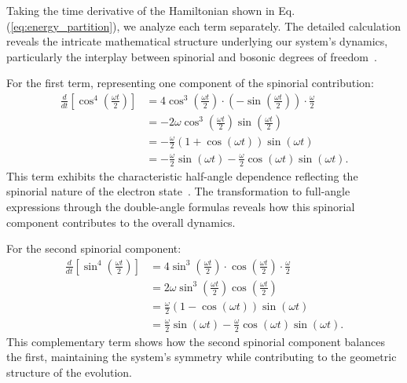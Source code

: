 \documentclass[%
 reprint,
 amsmath,amssymb,
 aps,
]{revtex4-1}
\numberwithin{equation}{section}%
\begin{document}
Taking the time derivative of the Hamiltonian shown in Eq. (\ref{eq:energy_partition}), we analyze each term separately. The detailed calculation reveals the intricate mathematical structure underlying our system's dynamics, particularly the interplay between spinorial and bosonic degrees of freedom~\cite{wilczek1984}.

For the first term, representing one component of the spinorial contribution:
\begin{equation}
    \begin{split}
        \frac{d}{dt}\left[\cos^4\left(\frac{\omega t}{2}\right)\right] &= 4\cos^3\left(\frac{\omega t}{2}\right) \cdot \left(-\sin\left(\frac{\omega t}{2}\right)\right) \cdot \frac{\omega}{2} \\
        &= -2\omega\cos^3\left(\frac{\omega t}{2}\right)\sin\left(\frac{\omega t}{2}\right) \\
        &= -\frac{\omega}{2}(1 + \cos(\omega t))\sin(\omega t) \\
        &= -\frac{\omega}{2}\sin(\omega t) - \frac{\omega}{2}\cos(\omega t)\sin(\omega t).
    \end{split}
    \label{eq:term1}
\end{equation}
This term exhibits the characteristic half-angle dependence reflecting the spinorial nature of the electron state~\cite{hanamura2023}. The transformation to full-angle expressions through the double-angle formulas reveals how this spinorial component contributes to the overall dynamics.

For the second spinorial component:
\begin{equation}
    \begin{split}
        \frac{d}{dt}\left[\sin^4\left(\frac{\omega t}{2}\right)\right] &= 4\sin^3\left(\frac{\omega t}{2}\right) \cdot \cos\left(\frac{\omega t}{2}\right) \cdot \frac{\omega}{2} \\
        &= 2\omega\sin^3\left(\frac{\omega t}{2}\right)\cos\left(\frac{\omega t}{2}\right) \\
        &= \frac{\omega}{2}(1 - \cos(\omega t))\sin(\omega t) \\
        &= \frac{\omega}{2}\sin(\omega t) - \frac{\omega}{2}\cos(\omega t)\sin(\omega t).
    \end{split}
    \label{eq:term2}
\end{equation}
This complementary term shows how the second spinorial component balances the first, maintaining the system's symmetry while contributing to the geometric structure of the evolution.
\end{document}
